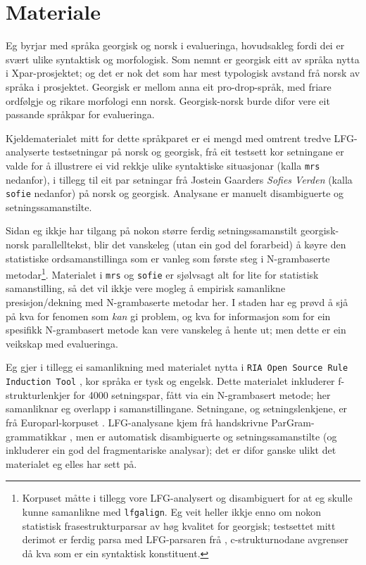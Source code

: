 \documentclass[12pt,a4paper,oneside,draft]{report}
\begin{document}
  
\section{Materiale}
\label{sec-5.1}

Eg byrjar med språka georgisk og norsk i evalueringa, hovudsakleg
 fordi dei er svært ulike syntaktisk og morfologisk. Som nemnt er
 georgisk eitt av språka nytta i Xpar-prosjektet; og det er nok det
 som har mest typologisk avstand frå norsk av språka i prosjektet.
 Georgisk er mellom anna eit pro-drop-språk, med friare ordfølgje og
 rikare morfologi enn norsk. Georgisk-norsk burde difor vere eit
 passande språkpar for evalueringa.

Kjeldematerialet mitt for dette språkparet er ei mengd med
 omtrent tredve LFG-analyserte testsetningar på norsk og georgisk, frå
 eit testsett kor setningane er valde for å illustrere ei vid rekkje
 ulike syntaktiske situasjonar (kalla \texttt{mrs} nedanfor), i tillegg til
 eit par setningar frå Jostein Gaarders \emph{Sofies Verden} (kalla \texttt{sofie}
 nedanfor) på norsk og georgisk. Analysane er manuelt disambiguerte og
 setningssamanstilte.

Sidan eg ikkje har tilgang på nokon større ferdig setningssamanstilt
 georgisk-norsk parallelltekst, blir det vanskeleg (utan ein god del
 forarbeid) å køyre den statistiske ordsamanstillinga som er vanleg
 som første steg i N-grambaserte metodar\footnote{Korpuset måtte i tillegg vore LFG-analysert og disambiguert
        for at eg skulle kunne samanlikne med \texttt{lfgalign}. Eg veit
        heller ikkje enno om nokon statistisk frasestrukturparsar av
        høg kvalitet for georgisk; testsettet mitt derimot er ferdig
        parsa med LFG-parsaren frå \citet{meurer2008cgg},
        c\hyp{}strukturnodane avgrenser då kva som er ein syntaktisk
        konstituent. }. Materialet i \texttt{mrs}
 og \texttt{sofie} er sjølvsagt alt for lite for statistisk samanstilling, så
 det vil ikkje vere mogleg å empirisk samanlikne presisjon/dekning med
 N-grambaserte metodar her. I staden har eg prøvd å sjå på kva for
 fenomen som \emph{kan} gi problem, og kva for informasjon som for ein
 spesifikk N-grambasert metode kan vere vanskeleg å hente ut; men
 dette er ein veikskap med evalueringa.

Eg gjer i tillegg ei samanlikning med materialet nytta i \texttt{RIA Open  Source Rule Induction Tool} \citep{graham2009osr,graham2009fts}, kor
 språka er tysk og engelsk. Dette materialet inkluderer
 f\hyp{}strukturlenkjer for 4000 setningspar, fått via ein N-grambasert
 metode; her samanliknar eg overlapp i samanstillingane.  Setningane,
 og setningslenkjene, er frå Europarl-korpuset
 \citep{koehn2005epc}. LFG-analysane kjem frå handskrivne
 ParGram-grammatikkar \citep[m.a.~][]{kaplan2002aeg}, men er automatisk
 disambiguerte og setningssamanstilte (og inkluderer ein god del
 fragmentariske analysar); det er difor ganske ulikt det materialet eg
 elles har sett på.
\end{document}
